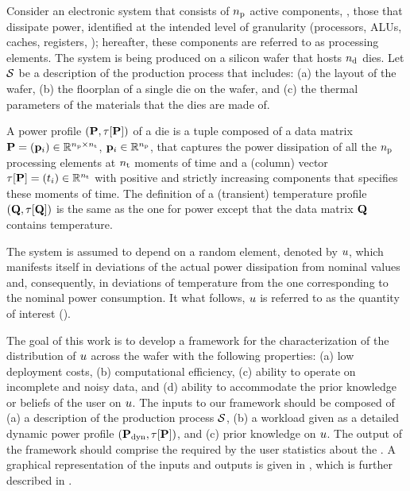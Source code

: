 Consider an electronic system that consists of ${n_\text{p}}$ active components, \ie, those that dissipate power, identified at the intended level of granularity (processors, ALUs, caches, registers, \etc); hereafter, these components are referred to as processing elements.
The system is being produced on a silicon wafer that hosts ${n_\text{d}}$ dies.
Let $\mathcal{S}$ be a description of the production process that includes: (a) the layout of the wafer, (b) the floorplan of a single die on the wafer, and (c) the thermal parameters of the materials that the dies are made of.

A power profile $\profileP$ of a die is a tuple composed of a data matrix $\mathbf{P} = (\mathbf{p}_i) \in \mathbb{R}^{{n_\text{p}} \times {n_\text{t}}}$, $\mathbf{p}_i \in \mathbb{R}^{n_\text{p}}$, that captures the power dissipation of all the ${n_\text{p}}$ processing elements at ${n_\text{t}}$ moments of time and a (column) vector $\tau[\mathbf{P}] = (t_i) \in \mathbb{R}^{{n_\text{t}}}$ with positive and strictly increasing components that specifies these moments of time.
The definition of a (transient) temperature profile $\profileT$ is the same as the one for power except that the data matrix $\mathbf{Q}$ contains temperature.

The system is assumed to depend on a random element, denoted by $u$, which manifests itself in deviations of the actual power dissipation from nominal values and, consequently, in deviations of temperature from the one corresponding to the nominal power consumption. It what follows, $u$ is referred to as the quantity of interest (\qoi).

The goal of this work is to develop a framework for the characterization of the distribution of $u$ across the wafer with the following properties: (a) low deployment costs, (b) computational efficiency, (c) ability to operate on incomplete and noisy data, and (d) ability to accommodate the prior knowledge or beliefs of the user on $u$.
The inputs to our framework should be composed of (a) a description of the production process $\mathcal{S}$, (b) a workload given as a detailed dynamic power profile $(\mathbf{P}_{\text{dyn}}, \tau[\mathbf{P}])$, and (c) prior knowledge on $u$.
The output of the framework should comprise the required by the user statistics about the \qoi.
A graphical representation of the inputs and outputs is given in , which is further described in .

